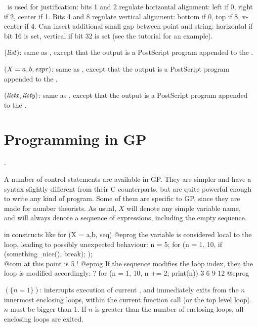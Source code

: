 \fl\ is used for justification: bits 1 and 2 regulate horizontal alignment:
left if 0, right if 2, center if 1. Bits 4 and 8 regulate vertical
alignment: bottom if 0, top if 8, v-center if 4. Can insert additional
small gap between point and string: horizontal if bit 16 is set, vertical
if bit 32 is set (see the tutorial for an example).

$(\hbox{\it list\/})$: same as , except that the
output is a PostScript program appended to the .

$(X=a,b,\hbox{\it expr\/})$: same as , except that the
output is a PostScript program appended to the .

$(\hbox{\it listx\/},\hbox{\it listy\/})$: same as ,
except that the output is a PostScript program appended to the .

\section{Programming in GP}
\label{se:programming}
.

  A number of control statements are available in GP. They are simpler and
have a syntax slightly different from their C counterparts, but are quite
powerful enough to write any kind of program. Some of them are specific to
GP, since they are made for number theorists. As usual, $X$ will denote any
simple variable name, and  will always denote a sequence of
expressions, including the empty sequence.

 in constructs like
\bprog
    for (X = a,b, seq)
@eprog\noindent
the variable  is considered local to the loop, leading to possibly
unexpected behaviour:
\bprog
    n = 5;
    for (n = 1, 10,
      if (something_nice(), break);
    );
    \\ @com at this point  is 5 !
@eprog\noindent
If the sequence  modifies the loop index, then the loop
is modified accordingly:
\bprog
    ? for (n = 1, 10, n += 2; print(n))
    3
    6
    9
    12
@eprog

$(\{n=1\})$: interrupts execution of current , and
immediately exits from the $n$ innermost enclosing loops, within the
current function call (or the top level loop). $n$ must be bigger than 1.
If $n$ is greater than the number of enclosing loops, all enclosing loops
are exited.

